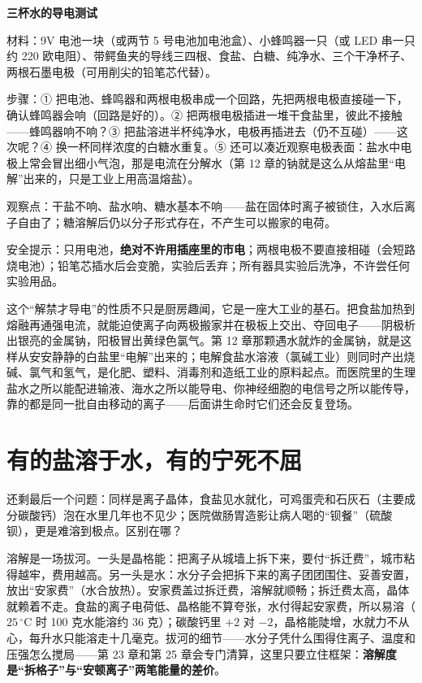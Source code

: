 \begin{shiyan}
\textbf{三杯水的导电测试}

材料：9V 电池一块（或两节 5 号电池加电池盒）、小蜂鸣器一只（或 LED 串一只约 220 欧电阻）、带鳄鱼夹的导线三四根、食盐、白糖、纯净水、三个干净杯子、两根石墨电极（可用削尖的铅笔芯代替）。

步骤：① 把电池、蜂鸣器和两根电极串成一个回路，先把两根电极直接碰一下，确认蜂鸣器会响（回路是好的）。② 把两根电极插进一堆干食盐里，彼此不接触——蜂鸣器响不响？③ 把盐溶进半杯纯净水，电极再插进去（仍不互碰）——这次呢？④ 换一杯同样浓度的白糖水重复。⑤ 还可以凑近观察电极表面：盐水中电极上常会冒出细小气泡，那是电流在分解水（第 12 章的钠就是这么从熔盐里“电解”出来的，只是工业上用高温熔盐）。

观察点：干盐不响、盐水响、糖水基本不响——盐在固体时离子被锁住，入水后离子自由了；糖溶解后仍以分子形式存在，不产生可以搬家的电荷。

安全提示：只用电池，\textbf{绝对不许用插座里的市电}；两根电极不要直接相碰（会短路烧电池）；铅笔芯插水后会变脆，实验后丢弃；所有器具实验后洗净，不许尝任何实验用品。
\end{shiyan}

这个“解禁才导电”的性质不只是厨房趣闻，它是一座大工业的基石。把食盐加热到熔融再通强电流，就能迫使离子向两极搬家并在极板上交出、夺回电子——阴极析出银亮的金属钠，阳极冒出黄绿色氯气。第 12 章那颗遇水就炸的金属钠，就是这样从安安静静的白盐里“电解”出来的；电解食盐水溶液（氯碱工业）则同时产出烧碱、氯气和氢气，是化肥、塑料、消毒剂和造纸工业的原料起点。而医院里的生理盐水之所以能配进输液、海水之所以能导电、你神经细胞的电信号之所以能传导，靠的都是同一批自由移动的离子——后面讲生命时它们还会反复登场。

\section{有的盐溶于水，有的宁死不屈}

还剩最后一个问题：同样是离子晶体，食盐见水就化，可鸡蛋壳和石灰石（主要成分碳酸钙）泡在水里几年也不见少；医院做肠胃造影让病人喝的“钡餐”（硫酸钡），更是难溶到极点。区别在哪？

溶解是一场拔河。一头是晶格能：把离子从城墙上拆下来，要付“拆迁费”，城市粘得越牢，费用越高。另一头是水：水分子会把拆下来的离子团团围住、妥善安置，放出“安家费”（水合放热）。安家费盖过拆迁费，溶解就顺畅；拆迁费太高，晶体就赖着不走。食盐的离子电荷低、晶格能不算夸张，水付得起安家费，所以易溶（$25\,^{\circ}\mathrm{C}$ 时 100 克水能溶约 36 克）；碳酸钙里 $+2$ 对 $-2$，晶格能陡增，水就力不从心，每升水只能溶走十几毫克。拔河的细节——水分子凭什么围得住离子、温度和压强怎么搅局——第 23 章和第 25 章会专门清算，这里只要立住框架：\textbf{溶解度是“拆格子”与“安顿离子”两笔能量的差价}。

